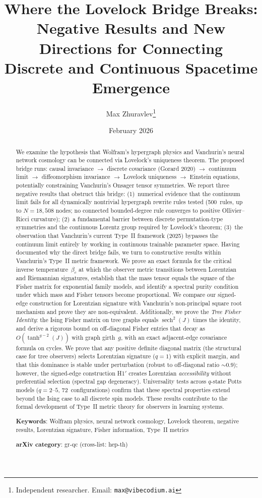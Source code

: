 \documentclass[11pt]{article}
\title{Where the Lovelock Bridge Breaks:\\
Negative Results and New Directions for Connecting\\
Discrete and Continuous Spacetime Emergence}
\author{Max Zhuravlev\thanks{Independent researcher. Email: \texttt{max@vibecodium.ai}}}
\date{February 2026}
\theoremstyle{definition}
\theoremstyle{remark}
\begin{document}
\maketitle

\begin{abstract}
We examine the hypothesis that Wolfram's hypergraph physics and Vanchurin's
neural network cosmology can be connected via Lovelock's uniqueness theorem.
The proposed bridge runs: causal invariance $\to$ discrete covariance (Gorard 2020)
$\to$ continuum limit $\to$ diffeomorphism invariance $\to$ Lovelock uniqueness $\to$
Einstein equations, potentially constraining Vanchurin's Onsager tensor symmetries.
We report three negative results that obstruct this bridge:
(1)~numerical evidence that the continuum limit fails for all dynamically
nontrivial hypergraph rewrite rules tested (500~rules, up to
$N = 18{,}508$ nodes; no connected bounded-degree rule converges to
positive Ollivier--Ricci curvature);
(2)~a fundamental barrier between discrete permutation-type symmetries and the
continuous Lorentz group required by Lovelock's theorem;
(3)~the observation that Vanchurin's current Type~II framework (2025)
bypasses the continuum limit entirely by working in continuous trainable
parameter space.
Having documented why the direct bridge fails, we turn to constructive results
within Vanchurin's Type~II metric framework.
We prove an exact formula for the critical inverse temperature~$\beta_c$ at
which the observer metric transitions between Lorentzian and Riemannian
signatures, establish that the mass tensor equals the square of the Fisher
matrix for exponential family models, and identify a spectral purity condition
under which mass and Fisher tensors become proportional.
We compare our signed-edge construction for Lorentzian signature with
Vanchurin's non-principal square root mechanism and prove they are
non-equivalent.
Additionally, we prove the \emph{Tree Fisher Identity}: the Ising Fisher
matrix on tree graphs equals $\operatorname{sech}^2(J)$ times the identity,
and derive a rigorous bound on off-diagonal Fisher entries that decay as
$O(\tanh^{g-2}(J))$ with graph girth~$g$, with an exact adjacent-edge
covariance formula on cycles.
We prove that any positive definite diagonal matrix (the structural
case for tree observers) selects Lorentzian signature ($q = 1$) with
explicit margin, and that this dominance is stable under perturbation
(robust to off-diagonal ratio ${\sim}0.9$); however, the signed-edge
construction H1$'$ creates Lorentzian \emph{accessibility} without
preferential selection (spectral gap degeneracy).
Universality tests across $q$-state Potts models ($q = 2$--$5$,
72~configurations) confirm that these spectral properties extend beyond
the Ising case to all discrete spin models.
These results contribute to the formal development of Type~II metric theory
for observers in learning systems.

\medskip
\noindent\textbf{Keywords}: Wolfram physics, neural network cosmology,
Lovelock theorem, negative results, Lorentzian signature, Fisher information,
Type~II metrics

\medskip
\noindent\textbf{arXiv category}: gr-qc (cross-list: hep-th)
\end{abstract}
\end{document}
